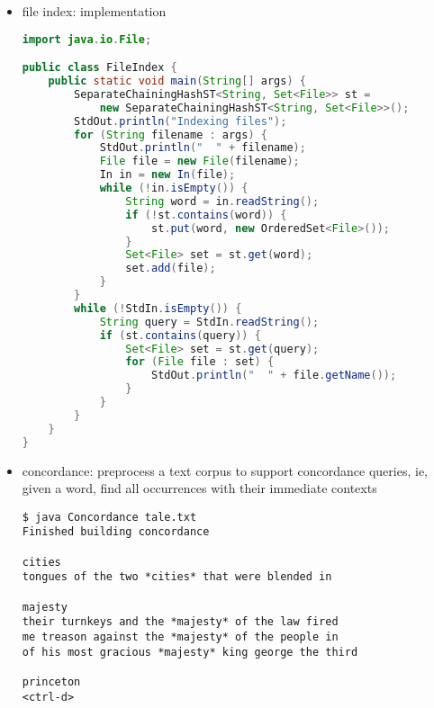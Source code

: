 \documentclass[8pt,a4paper,compress]{beamer}
\begin{document}
\begin{frame}[fragile]
\begin{itemize}
\item file index: implementation
\begin{lstlisting}[language=Java]
import java.io.File;

public class FileIndex { 
    public static void main(String[] args) {
        SeparateChainingHashST<String, Set<File>> st = 
            new SeparateChainingHashST<String, Set<File>>();
        StdOut.println("Indexing files");
        for (String filename : args) {
            StdOut.println("  " + filename);
            File file = new File(filename);
            In in = new In(file);
            while (!in.isEmpty()) {
                String word = in.readString();
                if (!st.contains(word)) { 
                    st.put(word, new OrderedSet<File>());
                }
                Set<File> set = st.get(word);
                set.add(file);
            }
        }
        while (!StdIn.isEmpty()) {
            String query = StdIn.readString();
            if (st.contains(query)) {
                Set<File> set = st.get(query);
                for (File file : set) {
                    StdOut.println("  " + file.getName());
                }
            }
        }
    }
}
\end{lstlisting}
\end{itemize}
\end{frame}

\begin{frame}[fragile]
\begin{itemize}
\item concordance: preprocess a text corpus to support concordance queries, ie, given a word, find all occurrences with their immediate contexts

\begin{lstlisting}[language={}]
$ java Concordance tale.txt
Finished building concordance

cities
tongues of the two *cities* that were blended in

majesty
their turnkeys and the *majesty* of the law fired
me treason against the *majesty* of the people in
of his most gracious *majesty* king george the third

princeton
<ctrl-d>
\end{lstlisting}
\end{itemize}
\end{frame}
\end{document}
